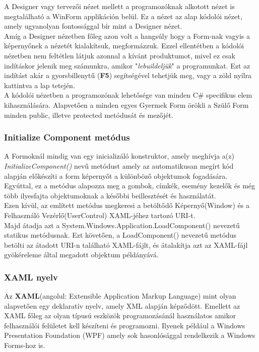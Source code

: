 \documentclass[tocnopagenum]{thesis-ekf}
\theoremstyle{definition}
\theoremstyle{remark}
\begin{document}
	A Designer vagy tervezői nézet mellett a programozóknak alkotott nézet is megtalálható a WinForm applikáción belül. Ez a nézet az alap kódolói nézet, amely ugyanolyan fontossággal bír mint a Designer nézet.
	\\
	Amíg a Designer nézetben főleg azon volt a hangsúly hogy a Form-nak vagyis a képernyőnek a nézetét kialakítsuk, megformázzuk. Ezzel ellentétben a kódolói nézetben nem feltétlen látjuk azonnal a kívánt produktumot, mivel ez csak indításkor jelenik meg számunkra, amikor "\textit{lebuildeljük}" a programunkat. Ezt az indítást akár a gyorsbillenytű (\textbf{F5}) segítségével tehetjük meg, vagy a zöld nyílra kattintva a lap tetején.
	\\
	A kódolói nézetben a programozónak lehetősége van minden C\# specifikus elem kihasználására. Alapvetően a minden egyes Gyermek Form örökli a Szülő Form minden public, illetve protected metódusát és mezőjét. 
	\\
	\subsubsection{Initialize Component metódus}
	A Formoknál mindig van egy inicializáló konstruktor, amely meghívja a(z) \textit{InitializeComponent()} nevű metódust amely az automatikusan megírt kód alapján előkészíti a form képernyőt a különböző objektumok fogadására. Egyúttal, ez a metódus alapozza meg a gombok, címkék, esemény kezelők és még több ilyesfajta objektumoknak a későbbi beillesztését és használatát.
\\
Ezen kívül, az említett metódus megkeresi a betöltődő Képernyő(Window) és a Felhasználó Vezérlő(UserControl) XAML-jéhez tartozó URI-t.
\\
Majd átadja azt a System.Windows.Application.LoadComponent() nevezetű statikus metódusnak.
Ezt követően, a LoadComponent() nevezetű metódus betölti az átadott URI-n található XAML-fájlt, és átalakítja azt az XAML-fájl gyökéreleme által megadott objektum példányává.
\\
\subsubsection{XAML nyelv}
Az \textbf{XAML}(angolul: Extensible Application Markup Language) mint olyan alapvetően egy deklaratív nyelv, amely XML alapján képződött.
Emellett az XAML főleg az olyan típusú eszközök programozásánál használatos amikor felhasználói felületet kell készíteni és programozni. Ilyenek például a Windows Presentation Foundation (WPF) amely sok hasonlósággal rendelkezik a Windows Forms-hoz is.
\\
\end{document}
